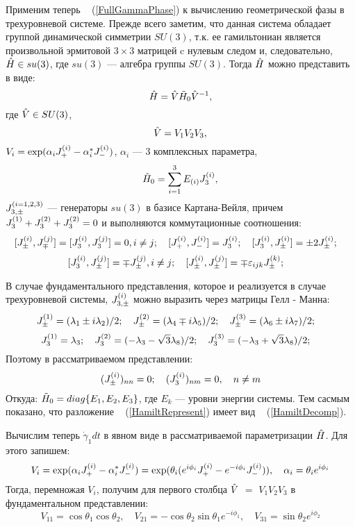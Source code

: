 \documentclass[a4paper]{article}
\def\Hhat{ \ifmmode {\hat H} \else {$\hat H$} \fi }
\def\HZtilde{ \ifmmode {\tilde H_0} \else {$\tilde H_0$} \fi}
\def\Vhat{ \ifmmode {\hat V} \else {$\hat V$} \fi}
\def\Jg#1#2{ \ifmmode {J^{(#1)}_{#2}} \else {$J^{(#1)}_{#2}$} \fi}
\def\lam#1{ \ifmmode {\lambda_#1} \else {$\lambda_#1$} \fi}
\def\cosT#1{\cos \theta_{#1}}
\begin{document}
Применим теперь ~ (\ref{FullGammaPhase}) к вычислению геометрической фазы в
трехуровневой системе.
Прежде всего заметим, что данная система обладает группой
динамической симметрии $SU(3)$, т.к. ее гамильтониан является
произвольной эрмитовой $3 \times 3$ матрицей c нулевым следом и,
следовательно, $\Hhat \in su(3)$, где $su(3)$ --- алгебра группы $SU(3)$.
Тогда $\Hhat$ можно представить в виде:
\begin{equation}
\Hhat = \Vhat \HZtilde \Vhat^{-1},
\label{HamiltRepresent}
\end{equation}
где $\Vhat \in SU(3)$,
\begin{equation}
  \Vhat = V_1 V_2 V_3,
  \label{VRepresent}
\end{equation}
$V_i = \exp(\alpha_i\Jg{i}{+} - \alpha_i^{\ast}\Jg{i}{-})$,
$\alpha_i$  ---  3 комплексных параметра,
$$
\HZtilde = \sum_{i=1}^{3} E_{(i)}\Jg{i}{3},
$$
$\Jg{i = 1, 2, 3}{3, \pm}$ --- генераторы
$su(3)$ в базисе Картана-Вейля, причем $\Jg{1}{3}+\Jg{2}{3}+\Jg{2}{3} = 0$
и выполняются коммутационные соотношения:
$$
[\Jg{i}{\pm}, \Jg{j}{\mp} ] = [ \Jg{i}{3},\Jg{j}{3} ] = 0,
  i \not= j; \quad
[ \Jg{i}{+}, \Jg{i}{-} ] = \Jg{i}{3}; \quad
[ \Jg{i}{3}, \Jg{i}{\pm} ] = \pm 2\Jg{i}{\pm}; \quad
$$
$$
[ \Jg{i}{3}, \Jg{j}{\pm} ] = \mp \Jg{j}{\pm}, i \not= j; \quad
[ \Jg{i}{\pm}, \Jg{j}{\pm} ] = \mp \varepsilon_{ijk}\Jg{k}{\pm};  \quad
$$

  В случае фундаментального представления, которое и
реализуется в случае трехуровневой системы, $\Jg{i}{3, \pm}$
можно выразить через матрицы Гелл - Манна:
$$
\Jg{1}{\pm} = (\lam{1} \pm i\lam{2}) / 2; \quad
\Jg{2}{\pm} = (\lam{4} \mp i\lam{5}) / 2; \quad
\Jg{3}{\pm} = (\lam{6} \pm i\lam{7}) / 2; \quad
$$
$$
\Jg{1}{3} = \lam{3}; \quad
\Jg{2}{3} = (-\lam{3} - \sqrt{3}\lam{8}) / 2; \quad
\Jg{3}{3} = (-\lam{3} + \sqrt{3}\lam{8}) / 2; \quad
$$
  Поэтому в рассматриваемом представлении:
$$
(\Jg{i}{\pm})_{nn} = 0; \quad (\Jg{i}{3})_{nm} = 0, \quad n \not= m
$$
Откуда: $ \HZtilde = diag\{E_1,E_2,E_3\}$, где $E_k$ --- уровни
энергии системы.
Тем сасмым показано, что разложение ~ (\ref{HamiltRepresent})
имеет вид ~ (\ref{HamiltDecomp}).

Вычислим теперь $\dot \gamma_1 dt$ в явном виде
в рассматриваемой параметризации $\Hhat$. Для этого запишем:
$$
V_i = \exp(\alpha_i\Jg{i}{+} - \alpha_i^{\ast}\Jg{i}{-}) =
\exp(\theta_i(e^{i\phi_i}\Jg{i}{+} - e^{-i\phi_i}\Jg{i}{-})), \quad
\alpha_i = \theta_i e^{i\phi_i}
$$
   Тогда, перемножая $V_i$, получим для первого столбца
$\Vhat$ $=$ $V_1V_2V_3$ в фундаментальном представлении:
\begin{equation}
    V_{11} = \cosT{1}\cosT{2}, \quad
    V_{21} = -\cosT{2} \sin \theta_1 e^{-i\phi_1}, \quad
    V_{31} = \sin \theta_2 e^{i\phi_2}
  \label{VMatrixExpression}
\end{equation}
\end{document}
